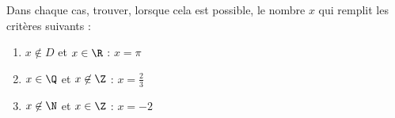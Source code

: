 
Dans chaque cas, trouver, lorsque cela est possible, le nombre $x$ qui remplit les critères suivants :
 
\begin{enumerate}
\item $x \not\in D$ et $x \in \R$ : $x=\pi$
\item $x \in \Q$ et $x \not\in \Z$ : $x=\frac{2}{3}$
\item $x \not\in \N$ et $x \in \Z$ : $x=-2$
\end{enumerate}